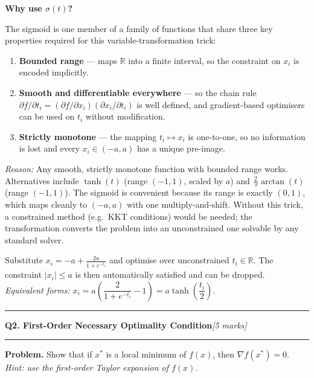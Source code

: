 \documentclass[10pt,a4paper]{article}
\newcommand{\sectitle}[2]{%
  \vspace{10pt}\noindent\rule{\linewidth}{0.8pt}\par\vspace{2pt}%
  {\large\textbf{#1}\hfill\normalsize\textit{[#2 marks]}}\par
  \vspace{2pt}\rule{\linewidth}{0.4pt}\vspace{4pt}}
\newcommand{\reason}[1]{%
  \begin{mdframed}[backgroundcolor=reasonbg, linewidth=0.4pt,
    innertopmargin=3pt, innerbottommargin=3pt,
    innerleftmargin=6pt, innerrightmargin=6pt]
    \small\textit{Reason:} \small #1
  \end{mdframed}\vspace{2pt}}
\newenvironment{resultbox}{%
  \begin{mdframed}[backgroundcolor=boxbg, linewidth=0.6pt,
    innertopmargin=5pt, innerbottommargin=5pt,
    innerleftmargin=8pt, innerrightmargin=8pt]
}{\end{mdframed}}
\begin{document}
\newpage
\textbf{Why use $\sigma(t)$?}

The sigmoid is one member of a family of functions that share three key properties
required for this variable-transformation trick:
\begin{enumerate}
  \item \textbf{Bounded range} --- maps $\mathbb{R}$ into a finite interval,
        so the constraint on $x_i$ is encoded implicitly.
  \item \textbf{Smooth and differentiable everywhere} --- so the chain rule
        $\partial f/\partial t_i = (\partial f/\partial x_i)(\partial x_i/\partial t_i)$
        is well defined, and gradient-based optimisers can be used on $t_i$
        without modification.
  \item \textbf{Strictly monotone} --- the mapping $t_i\mapsto x_i$ is one-to-one,
        so no information is lost and every $x_i\in(-a,a)$ has a unique pre-image.
\end{enumerate}

\reason{Any smooth, strictly monotone function with bounded range works.
        Alternatives include $\tanh(t)$ (range $(-1,1)$, scaled by $a$) and
        $\tfrac{2}{\ \pi}\arctan(t)$ (range $(-1,1)$).
        The sigmoid is convenient because its range is exactly $(0,1)$,
        which maps cleanly to $(-a,a)$ with one multiply-and-shift.
        Without this trick, a constrained method (e.g.\ KKT conditions)
        would be needed; the transformation converts the problem into
        an unconstrained one solvable by any standard solver.}

\begin{resultbox}
Substitute $\displaystyle x_i = -a + \frac{2a}{1+e^{-t_i}}$
and optimise over unconstrained $t_i\in\mathbb{R}$.
The constraint $|x_i|\le a$ is then automatically satisfied and can be dropped.
\smallskip\\
\textit{Equivalent forms:}\;
$x_i = a\!\left(\dfrac{2}{1+e^{-t_i}}-1\right) = a\tanh\!\left(\dfrac{t_i}{2}\right)$.
\end{resultbox}

\newpage
\sectitle{Q2. First-Order Necessary Optimality Condition}{5}

\noindent\textbf{Problem.} Show that if $x^*$ is a local minimum of $f(x)$,
then $\nabla f(x^*)=0$.
\textit{Hint: use the first-order Taylor expansion of $f(x)$.}
\end{document}
